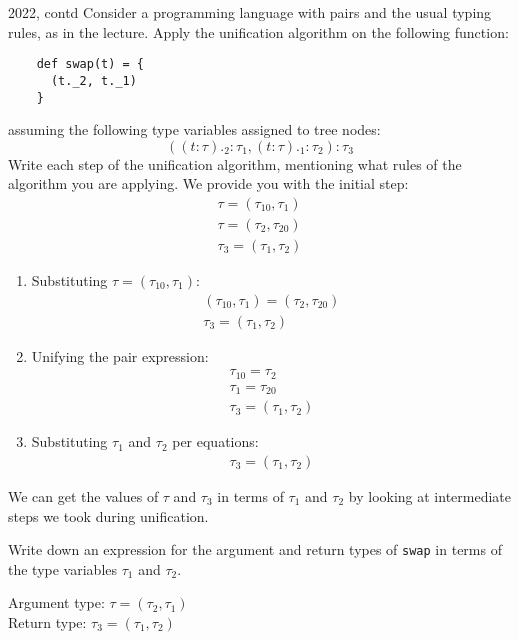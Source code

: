 \begin{exercise}{2022, contd}
  Consider a programming language with pairs and the usual typing rules, as in
  the lecture. Apply the unification algorithm on the following function:
  \begin{lstlisting}
    def swap(t) = {
      (t._2, t._1)
    }
  \end{lstlisting}
  assuming the following type variables assigned to tree nodes:
  \begin{equation*}
    ((t: \tau)._2: \tau_1, (t: \tau)._1: \tau_2): \tau_3
  \end{equation*}
  Write each step of the unification algorithm, mentioning what rules of the
  algorithm you are applying. We provide you with the initial step:
  \begin{gather*}
    \tau = (\tau_{10}, \tau_1) \\
    \tau = (\tau_{2}, \tau_{20}) \\
    \tau_3 = (\tau_{1}, \tau_{2})
  \end{gather*}

  \begin{solution}
    \begin{enumerate}
      \item Substituting \(\tau = (\tau_{10}, \tau_1)\):
      \begin{gather*}
        (\tau_{10}, \tau_1) = (\tau_{2}, \tau_{20}) \\
        \tau_3 = (\tau_{1}, \tau_{2})
      \end{gather*}
      \item Unifying the pair expression:
      \begin{gather*}
        \tau_{10} = \tau_{2} \\
        \tau_1 = \tau_{20} \\
        \tau_3 = (\tau_{1}, \tau_{2})
      \end{gather*}
      \item Substituting \(\tau_1\) and \(\tau_2\) per equations:
      \begin{gather*}
        \tau_3 = (\tau_{1}, \tau_{2}) 
      \end{gather*}
    \end{enumerate}

    We can get the values of \(\tau\) and \(\tau_3\) in terms of \(\tau_1\) and
    \(\tau_2\) by looking at intermediate steps we took during unification.
  \end{solution}

  Write down an expression for the argument and return types of \lstinline|swap|
  in terms of the type variables \(\tau_1\) and \(\tau_2\).

  \begin{solution}
    Argument type: \(\tau = (\tau_2, \tau_1)\) \\

    Return type: \(\tau_3 = (\tau_1, \tau_2)\)
  \end{solution}
\end{exercise}
